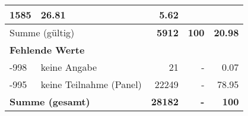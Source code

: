\begin{longtable}{lXrrr}
       \num{1585} &
       \num[round-mode=places,round-precision=2]{26.81} &
         \num[round-mode=places,round-precision=2]{5.62} \\
     \midrule
     \multicolumn{2}{l}{Summe (gültig)} &
       \textbf{\num{5912}} &
     \textbf{\num{100}} &
       \textbf{\num[round-mode=places,round-precision=2]{20.98}} \\
     \multicolumn{5}{l}{\textbf{Fehlende Werte}}\\
       -998 &
       keine Angabe &
         \num{21} &
        - &
         \num[round-mode=places,round-precision=2]{0.07} \\
       -995 &
       keine Teilnahme (Panel) &
         \num{22249} &
        - &
         \num[round-mode=places,round-precision=2]{78.95} \\
     \midrule
     \multicolumn{2}{l}{\textbf{Summe (gesamt)}} &
          \textbf{\num{28182}} &
        \textbf{-} &
        \textbf{\num{100}} \\
     \bottomrule
     \end{longtable}
     
